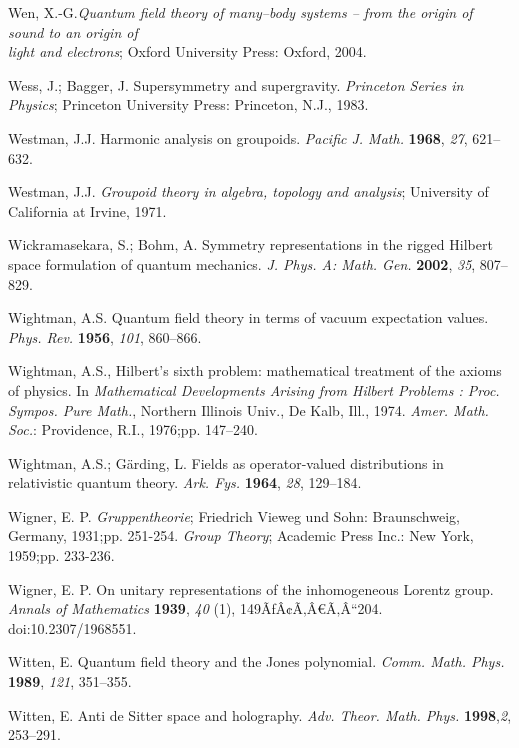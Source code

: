 \documentclass[12pt]{article}
\theoremstyle{plain}
\theoremstyle{definition}
\numberwithin{equation}{section}
\begin{document}
\begin{thebibliography}{99}
Wen, X.-G.{\em Quantum field theory of many--body systems -- from the origin of sound to an origin of\\  light and electrons}; Oxford University Press: Oxford, 2004.

Wess, J.; Bagger, J. Supersymmetry and supergravity. {\em Princeton Series in Physics}; Princeton University Press: Princeton, N.J., 1983.

Westman, J.J. Harmonic analysis on groupoids. {\em Pacific J. Math.} {\bf 1968}, {\em 27}, 621--632.

Westman, J.J. {\em Groupoid theory in algebra, topology and analysis}; University of California at Irvine, 1971.

Wickramasekara, S.; Bohm, A.  Symmetry representations in the rigged Hilbert space formulation of quantum mechanics.  {\em J. Phys. A: Math. Gen.} {\bf 2002}, {\em 35}, 807--829. 


Wightman, A.S. Quantum field theory in terms of vacuum expectation values. {\em Phys. Rev.} {\bf 1956}, {\em 101}, 860--866.

Wightman, A.S., Hilbert's sixth problem: mathematical treatment of the axioms of physics.  In {\em Mathematical Developments Arising from Hilbert Problems : Proc. Sympos. Pure Math.}, Northern Illinois Univ., De Kalb, Ill., 1974. {\em Amer. Math. Soc.}: Providence, R.I., 1976;pp. 147--240.

Wightman, A.S.; G\"arding,  L.  Fields as operator-valued distributions in relativistic quantum theory. {\em Ark. Fys.} {\bf 1964}, {\em 28}, 129--184.

 Wigner, E. P. \emph {Gruppentheorie}; Friedrich Vieweg und Sohn: Braunschweig, Germany, 1931;pp. 251-254. {\em Group Theory}; Academic Press Inc.: New York, 1959;pp. 233-236.

Wigner, E. P.  On unitary representations of the inhomogeneous Lorentz group. {\em Annals of Mathematics} {\bf 1939}, {\em 40} (1), 149ÃƒÂ¢Ã‚Â€Ã‚Â“204. doi:10.2307/1968551.

Witten, E. Quantum field theory and the Jones polynomial. {\em Comm. Math. Phys.} {\bf 1989}, {\em 121}, 351--355.

Witten, E. Anti de Sitter space and holography. {\em Adv. Theor. Math. Phys.} {\bf 1998},{\em 2}, 253--291. 


\end{thebibliography}
\end{document}

